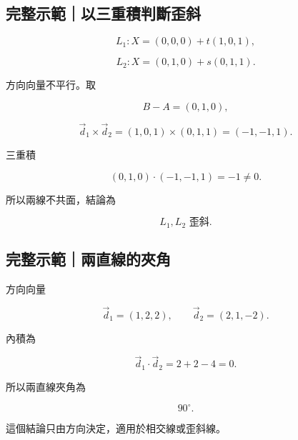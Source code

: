 \documentclass[11pt,a4paper]{article}
\begin{document}
\begin{HandoutWorkedExample}

\subsection{完整示範｜以三重積判斷歪斜}\label{ux5b8cux6574ux793aux7bc4ux4ee5ux4e09ux91cdux7a4dux5224ux65b7ux6b6aux659c}

\[
L_1:X=(0,0,0)+t(1,0,1),
\]

\[
L_2:X=(0,1,0)+s(0,1,1).
\]

方向向量不平行。取

\[
B-A=(0,1,0),
\]

\[
\vec d_1\times\vec d_2
=(1,0,1)\times(0,1,1)
=(-1,-1,1).
\]

三重積

\[
(0,1,0)\cdot(-1,-1,1)=-1\ne0.
\]

所以兩線不共面，結論為

\[
\boxed{L_1,L_2\text{ 歪斜}}.
\]

\end{HandoutWorkedExample}

\begin{HandoutWorkedExample}

\subsection{完整示範｜兩直線的夾角}\label{ux5b8cux6574ux793aux7bc4ux5169ux76f4ux7ddaux7684ux593eux89d2}

方向向量

\[
\vec d_1=(1,2,2),
\qquad
\vec d_2=(2,1,-2).
\]

內積為

\[
\vec d_1\cdot\vec d_2=2+2-4=0.
\]

所以兩直線夾角為

\[
\boxed{90^\circ}.
\]

這個結論只由方向決定，適用於相交線或歪斜線。

\end{HandoutWorkedExample}
\end{document}
